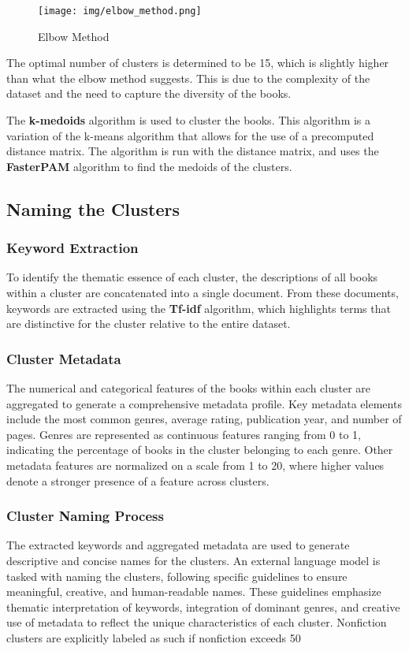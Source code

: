\documentclass[english]{mvi-report}
\begin{document}
\begin{figure}[H]
    \centering
    \texttt{[image: img/elbow\_method.png]}
    \caption{Elbow Method}
    \label{fig:elbow_method}
\end{figure}

The optimal number of clusters is determined to be 15, which is slightly higher than what the elbow method suggests. This is due to the complexity of the dataset and the need to capture the diversity of the books.

The \textbf{k-medoids} algorithm is used to cluster the books. This algorithm is a variation of the k-means algorithm that allows for the use of a precomputed distance matrix. The algorithm is run with the distance matrix, and uses the \textbf{FasterPAM} algorithm to find the medoids of the clusters.

\subsection{Naming the Clusters}
\subsubsection{Keyword Extraction}
To identify the thematic essence of each cluster, the descriptions of all books within a cluster are concatenated into a single document. From these documents, keywords are extracted using the \textbf{Tf-idf} algorithm, which highlights terms that are distinctive for the cluster relative to the entire dataset.

\subsubsection{Cluster Metadata}
The numerical and categorical features of the books within each cluster are aggregated to generate a comprehensive metadata profile. Key metadata elements include the most common genres, average rating, publication year, and number of pages. Genres are represented as continuous features ranging from 0 to 1, indicating the percentage of books in the cluster belonging to each genre. Other metadata features are normalized on a scale from 1 to 20, where higher values denote a stronger presence of a feature across clusters.

\subsubsection{Cluster Naming Process}
The extracted keywords and aggregated metadata are used to generate descriptive and concise names for the clusters. An external language model is tasked with naming the clusters, following specific guidelines to ensure meaningful, creative, and human-readable names. These guidelines emphasize thematic interpretation of keywords, integration of dominant genres, and creative use of metadata to reflect the unique characteristics of each cluster. Nonfiction clusters are explicitly labeled as such if nonfiction exceeds 50%
\end{document}
